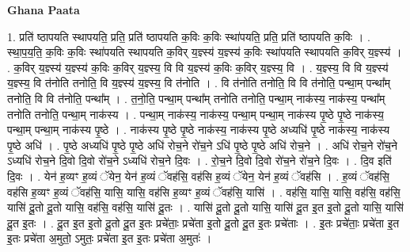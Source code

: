 \documentclass[17pt]{extarticle}
\begin{document}
\textbf{Ghana Paata } \newline

1. प्रति॑ ष्ठापयति स्थापयति॒ प्रति॒ प्रति॑ ष्ठापयति क॒विः क॒विः स्था॑पयति॒ प्रति॒ प्रति॑ ष्ठापयति क॒विः । . स्था॒प॒य॒ति॒ क॒विः क॒विः स्था॑पयति स्थापयति क॒विर् य॒ज्ञ्स्य॑ य॒ज्ञ्स्य॑ क॒विः स्था॑पयति स्थापयति क॒विर् य॒ज्ञ्स्य॑ । . क॒विर् य॒ज्ञ्स्य॑ य॒ज्ञ्स्य॑ क॒विः क॒विर् य॒ज्ञ्स्य॒ वि वि य॒ज्ञ्स्य॑ क॒विः क॒विर् य॒ज्ञ्स्य॒ वि । . य॒ज्ञ्स्य॒ वि वि य॒ज्ञ्स्य॑ य॒ज्ञ्स्य॒ वि त॑नोति तनोति॒ वि य॒ज्ञ्स्य॑ य॒ज्ञ्स्य॒ वि त॑नोति । . वि त॑नोति तनोति॒ वि वि त॑नोति॒ पन्था॒म् पन्था᳚म् तनोति॒ वि वि त॑नोति॒ पन्था᳚म् । . त॒नो॒ति॒ पन्था॒म् पन्था᳚म् तनोति तनोति॒ पन्था॒म् नाक॑स्य॒ नाक॑स्य॒ पन्था᳚म् तनोति तनोति॒ पन्था॒म् नाक॑स्य । . पन्था॒म् नाक॑स्य॒ नाक॑स्य॒ पन्था॒म् पन्था॒म् नाक॑स्य पृ॒ष्ठे पृ॒ष्ठे नाक॑स्य॒ पन्था॒म् पन्था॒म् नाक॑स्य पृ॒ष्ठे । . नाक॑स्य पृ॒ष्ठे पृ॒ष्ठे नाक॑स्य॒ नाक॑स्य पृ॒ष्ठे अध्यधि॑ पृ॒ष्ठे नाक॑स्य॒ नाक॑स्य पृ॒ष्ठे अधि॑ । . पृ॒ष्ठे अध्यधि॑ पृ॒ष्ठे पृ॒ष्ठे अधि॑ रोच॒ने रो॑च॒ने ऽधि॑ पृ॒ष्ठे पृ॒ष्ठे अधि॑ रोच॒ने । . अधि॑ रोच॒ने रो॑च॒ने ऽध्यधि॑ रोच॒ने दि॒वो दि॒वो रो॑च॒ने ऽध्यधि॑ रोच॒ने दि॒वः । . रो॒च॒ने दि॒वो दि॒वो रो॑च॒ने रो॑च॒ने दि॒वः । . दि॒व इति॑ दि॒वः । . येन॑ ह॒व्यꣳ ह॒व्यं ॅयेन॒ येन॑ ह॒व्यं ॅवह॑सि॒ वह॑सि ह॒व्यं ॅयेन॒ येन॑ ह॒व्यं ॅवह॑सि । . ह॒व्यं ॅवह॑सि॒ वह॑सि ह॒व्यꣳ ह॒व्यं ॅवह॑सि॒ यासि॒ यासि॒ वह॑सि ह॒व्यꣳ ह॒व्यं ॅवह॑सि॒ यासि॑ । . वह॑सि॒ यासि॒ यासि॒ वह॑सि॒ वह॑सि॒ यासि॑ दू॒तो दू॒तो यासि॒ वह॑सि॒ वह॑सि॒ यासि॑ दू॒तः । . यासि॑ दू॒तो दू॒तो यासि॒ यासि॑ दू॒त इ॒त इ॒तो दू॒तो यासि॒ यासि॑ दू॒त इ॒तः । . दू॒त इ॒त इ॒तो दू॒तो दू॒त इ॒तः प्रचे॑ताः॒ प्रचे॑ता इ॒तो दू॒तो दू॒त इ॒तः प्रचे॑ताः । . इ॒तः प्रचे॑ताः॒ प्रचे॑ता इ॒त इ॒तः प्रचे॑ता अ॒मुतो॒ ऽमुतः॒ प्रचे॑ता इ॒त इ॒तः प्रचे॑ता अ॒मुतः॑ । \newline
\end{document}
